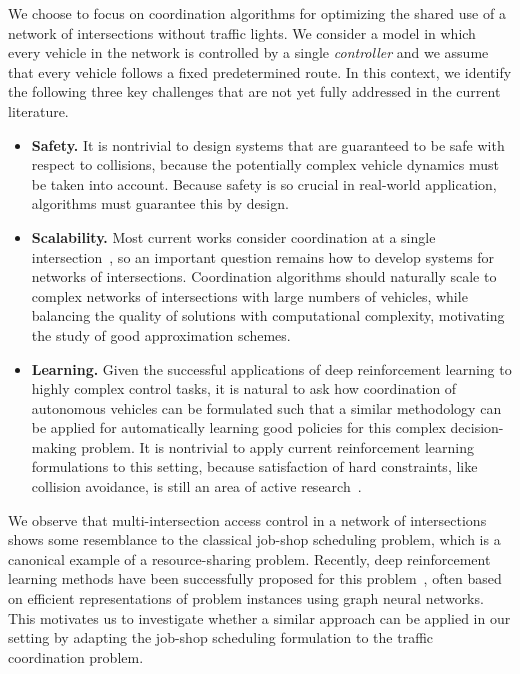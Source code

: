 \documentclass{article}
\theoremstyle{definition}
\theoremstyle{plain}
\begin{document}
We choose to focus on coordination algorithms for optimizing the shared use of a
network of intersections without traffic lights. We consider a model in which
every vehicle in the network is controlled by a single \textit{controller} and
we assume that every vehicle follows a fixed predetermined route.
%
In this context, we identify the following three key challenges
that are not yet fully addressed in the current literature.


\begin{itemize}

  \item \textbf{Safety.} It is nontrivial to design systems that are guaranteed
        to be safe with respect to collisions, because the potentially complex
        vehicle dynamics must be taken into account. Because safety is so
        crucial in real-world application, algorithms must guarantee this by
        design.

  \item \textbf{Scalability.} Most current works consider coordination at a
        single intersection~\cite{khayatianSurveyIntersectionManagement2020}, so
        an important question remains how to develop systems for networks of
        intersections. Coordination algorithms should naturally scale to complex
        networks of intersections with large numbers of vehicles, while
        balancing the quality of solutions with computational complexity,
        motivating the study of good approximation schemes.

  \item \textbf{Learning.} Given the successful applications of deep
        reinforcement learning to highly complex control tasks, it is natural to
        ask how coordination of autonomous vehicles can be formulated such that
        a similar methodology can be applied for automatically learning good
        policies for this complex decision-making problem.
        It is nontrivial to apply current reinforcement learning formulations to
        this setting, because satisfaction of hard constraints, like collision
        avoidance, is still an area of active
        research~\cite{minHardConstrainedNeuralNetworks2024}.
\end{itemize}

We observe that multi-intersection access control in a network of intersections shows some
resemblance to the classical job-shop scheduling problem, which is a canonical
example of a resource-sharing problem. Recently, deep reinforcement learning
methods have been successfully proposed for this problem~\cite{zhangLearningDispatchJob2020,zhangDeepReinforcementLearning2024,smitGraphNeuralNetworks2024}, often based on
efficient representations of problem instances using graph neural networks. This
motivates us to investigate whether a similar approach can be applied in our
setting by adapting the job-shop scheduling formulation to the traffic
coordination problem.
\end{document}
